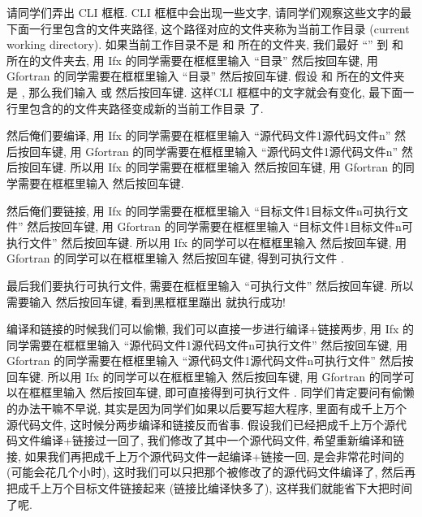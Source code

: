 请同学们弄出 CLI 框框. CLI 框框中会出现一些文字, 请同学们观察这些文字的最下面一行里包含的文件夹路径, 这个路径对应的文件夹称为当前工作目录 (current working directory). 如果当前工作目录不是  和  所在的文件夹, 我们最好 ``'' 到  和  所在的文件夹去, 用 Ifx 的同学需要在框框里输入 ``\textsf{目录}'' 然后按回车键, 用 Gfortran 的同学需要在框框里输入 ``\textsf{目录}'' 然后按回车键. 假设  和  所在的文件夹是 , 那么我们输入  或 然后按回车键. 这样CLI 框框中的文字就会有变化, 最下面一行里包含的的文件夹路径变成新的当前工作目录  了.

然后俺们要编译, 用 Ifx 的同学需要在框框里输入 ``\textsf{源代码文件$\!$1}\textsf{源代码文件$\!$n}'' 然后按回车键, 用 Gfortran 的同学需要在框框里输入 ``\textsf{源代码文件$\!$1}\textsf{源代码文件$\!$n}'' 然后按回车键. 所以用 Ifx 的同学需要在框框里输入  然后按回车键, 用 Gfortran 的同学需要在框框里输入  然后按回车键.

然后俺们要链接, 用 Ifx 的同学需要在框框里输入 ``\textsf{目标文件$\!$1}\textsf{目标文件$\!$n}\textsf{可执行文件}'' 然后按回车键, 用 Gfortran 的同学需要在框框里输入 ``\textsf{目标文件$\!$1}\textsf{目标文件$\!$n}\textsf{可执行文件}'' 然后按回车键. 所以用 Ifx 的同学可以在框框里输入  然后按回车键, 用 Gfortran 的同学可以在框框里输入  然后按回车键, 得到可执行文件 .

最后我们要执行可执行文件, 需要在框框里输入 ``\textsf{可执行文件}'' 然后按回车键. 所以需要输入  然后按回车键, 看到黑框框里蹦出  就执行成功!

编译和链接的时候我们可以偷懒, 我们可以直接一步进行编译+链接两步, 用 Ifx 的同学需要在框框里输入 ``\textsf{源代码文件$\!$1}\textsf{源代码文件$\!$n}\textsf{可执行文件}'' 然后按回车键, 用 Gfortran 的同学需要在框框里输入 ``\textsf{源代码文件$\!$1}\textsf{源代码文件$\!$n}\textsf{可执行文件}'' 然后按回车键. 所以用 Ifx 的同学可以在框框里输入  然后按回车键, 用 Gfortran 的同学可以在框框里输入  然后按回车键, 即可直接得到可执行文件 . 同学们肯定要问有偷懒的办法干嘛不早说, 其实是因为同学们如果以后要写超大程序, 里面有成千上万个源代码文件, 这时候分两步编译和链接反而省事. 假设我们已经把成千上万个源代码文件编译+链接过一回了, 我们修改了其中一个源代码文件, 希望重新编译和链接, 如果我们再把成千上万个源代码文件一起编译+链接一回, 是会非常花时间的 (可能会花几个小时), 这时我们可以只把那个被修改了的源代码文件编译了, 然后再把成千上万个目标文件链接起来 (链接比编译快多了), 这样我们就能省下大把时间了呢.

